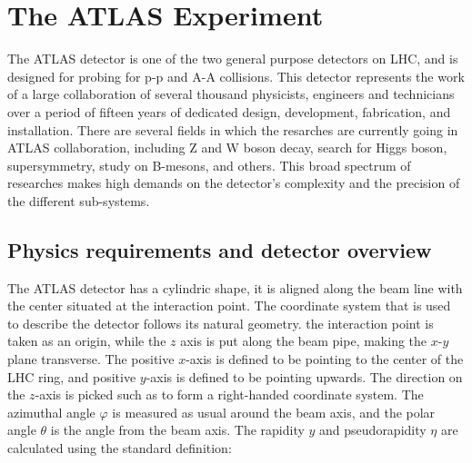 \chapter{The ATLAS Experiment}
\label{sec:ATLAS}

The ATLAS detector is one of the two general purpose detectors on LHC, and is designed for probing for p-p and A-A collisions.
This detector represents the work of a large collaboration of several thousand physicists, engineers and technicians over a period of fifteen years of dedicated design, development, fabrication, and installation. There are several fields in which the resarches are currently going in ATLAS collaboration, including Z and W boson decay, search for Higgs boson,
supersymmetry, study on B-mesons, and others. This broad spectrum of researches makes high demands on the detector's complexity and the precision 
of the different sub-systems.

\section{Physics requirements and detector overview}
\label{sec:ATLAS_overview}
The ATLAS detector has a cylindric shape, it is aligned along the beam line with the center situated at the interaction point.
The coordinate system that is used to describe the detector follows its natural geometry. the interaction point is taken as an origin,
while the $z$ axis is put along the beam pipe, making the $x$-$y$ plane transverse. The positive $x$-axis is defined to be pointing to the center
of the LHC ring, and positive $y$-axis is defined to be pointing upwards. The direction on the $z$-axis is picked such as to form a right-handed coordinate system.
The azimuthal angle $\varphi$ is measured as usual around the beam axis, and the polar angle $\theta$ is the angle from the beam axis. The rapidity $y$ and pseudorapidity $\eta$
are calculated using the standard definition:



\begin{figure}
\end{figure}

